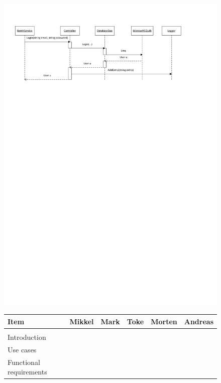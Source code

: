 \documentclass[a4paper,11pt,report]{article}
\begin{document}
{\begin{figure}[htp]
\centering
\includegraphics[width=17cm,keepaspectratio=true]{./LoginSD.pdf}
\end{figure}
\begin{figure}[htp]
\begin{tabular}{| l | l | l | l | l | l |}
  \hline
  Item & Mikkel & Mark & Toke & Morten & Andreas \\
  \hline
  \rowcolor{LightGray}\multicolumn{6}{|l|}{Documentation} \\
  \hline
  Introduction &  &\cellcolor{Gray} &\cellcolor{Gray}&  & \\
  \hline
  Use cases & \cellcolor{Gray} & \cellcolor{Gray} & \cellcolor{Gray} & \cellcolor{Gray} & \cellcolor{Gray} \\
  \hline
  Functional requirements & \cellcolor{Gray} & \cellcolor{Gray} & \cellcolor{Gray} & \cellcolor{Gray} & \cellcolor{Gray} \\

\end{tabular}
\end{figure}}
\end{document}
